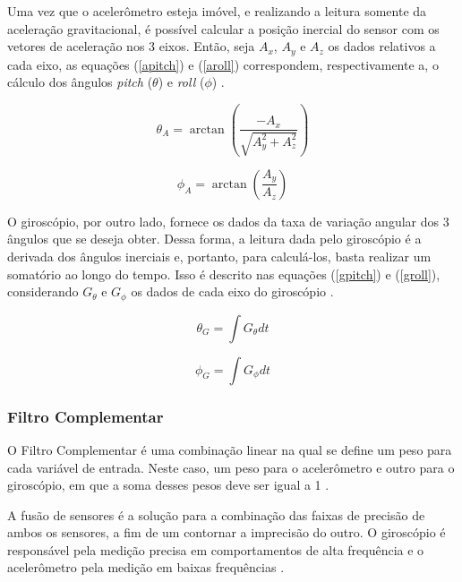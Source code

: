Uma vez que o acelerômetro esteja imóvel, e realizando a leitura somente da aceleração gravitacional, é possível calcular a posição inercial do sensor com os vetores de aceleração nos 3 eixos. Então, seja $ A_x $, $A_y$ e $A_z$ os dados relativos a cada eixo, as equações (\ref{apitch}) e (\ref{aroll}) correspondem, respectivamente a, o cálculo dos ângulos \textit{pitch} ($ \theta $) e \textit{roll} ($ \phi $) \cite{diss:coimbraSergio}. 

\begin{equation}
	\theta_A = \arctan\left(\dfrac{-A_x}{\sqrt{A_y^2+A_z^2}}\right) 
	\label{apitch}
\end{equation}

\begin{equation}
	\phi_A = \arctan\left(\dfrac{A_y}{A_z}\right)
	\label{aroll}
\end{equation}

O giroscópio, por outro lado, fornece os dados da taxa de variação angular dos 3 ângulos que se deseja obter. Dessa forma, a leitura dada pelo giroscópio é a derivada dos ângulos inerciais e, portanto, para calculá-los, basta realizar um somatório ao longo do tempo. Isso é descrito nas equações (\ref{gpitch}) e (\ref{groll}), considerando $G_{\theta}$ e $G_{\phi}$ os dados de cada eixo do giroscópio  \cite{diss:coimbraSergio}. 

\begin{equation}
	\theta_G = \int G_{\theta} dt
	\label{gpitch}
\end{equation}

\begin{equation}
	\phi_G = \int G_{\phi} dt
	\label{groll}
\end{equation}

\subsubsection{Filtro Complementar}

O Filtro Complementar é uma combinação linear na qual se define um peso para cada variável de entrada. Neste caso, um peso para o acelerômetro e outro para o giroscópio, em que a soma desses pesos deve ser igual a 1 \cite{tcc:viniciusPID2Graus}. 

A fusão de sensores é a solução para a combinação das faixas de precisão de ambos os sensores, a fim de um contornar a imprecisão do outro. O giroscópio é responsável pela medição precisa em comportamentos de alta frequência e o acelerômetro pela medição em baixas frequências \cite{artigo:forscienceKalman}. 


